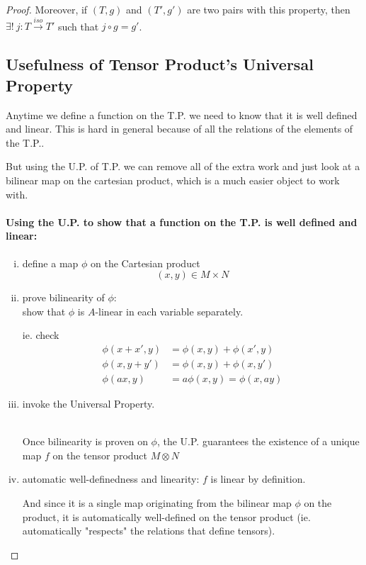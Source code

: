\documentclass{article}
\theoremstyle{definition}
\newenvironment{prop}[1]
{\renewcommand\theinnerprop{#1}\innerprop}
{\endinnerprop}
\begin{document}
\begin{proof}
\begin{prop}{2.12}
    Moreover, if $(T,g)$ and $(T',g')$ are two pairs with this property, then $\exists !~ j: T \stackrel{iso}{\longrightarrow} T'$ such that $j \circ g = g'$.
  \end{prop}

  \subsection{Usefulness of Tensor Product's Universal Property}
  Anytime we define a function on the T.P. we need to know that it is well defined and linear. This is hard in general because of all the relations of the elements of the T.P..

  But using the U.P. of T.P. we can remove all of the extra work and just look at a bilinear map on the cartesian product, which is a much easier object to work with.

  \paragraph{Using the U.P. to show that a function on the T.P. is well defined and linear:}
  \begin{enumerate}[i.]
    \item define a map $\phi$ on the Cartesian product
      $$(x,y) \in M \times N$$
      
    \item prove bilinearity of $\phi$:\\
      show that $\phi$ is $A$-linear in each variable separately.

      ie. check
      \begin{align*}
        \phi(x + x', y) &= \phi(x, y) + \phi(x', y)\\
        \phi(x, y + y') &= \phi(x, y) + \phi(x, y')\\
        \phi(ax, y) &= a \phi(x, y) = \phi(x, ay)
      \end{align*}

    \item invoke the Universal Property.\\\

      Once bilinearity is proven on $\phi$, the U.P. guarantees the existence of a unique map $f$ on the tensor product $M \otimes N$

    \item automatic well-definedness and linearity: $f$ is linear by definition.

    And since it is a single map originating from the bilinear map $\phi$ on the product, it is automatically well-defined on the tensor product (ie. automatically "respects" the relations that define tensors).
  \end{enumerate}


\end{proof}
\end{document}
